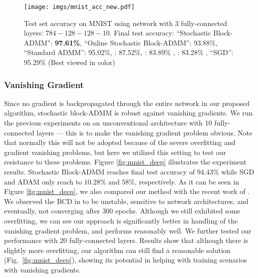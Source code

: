 \begin{figure}[ht]
\begin{center}
\centerline{
\texttt{[image: imgs/mnist\_acc\_new.pdf]}
}
\caption{Test set accuracy on MNIST using network with 3 fully-connected layers: $784-128-128-10$. 
Final test accuracy: ``Stochastic Block-ADMM'': {\bf 97.61\%}, 
``Online Stochastic Block-ADMM'': 93.88\%, 
``Standard ADMM'': 95.02\%, 
\protect \cite{taylor2016training}
: 87.52\%, 
\protect \cite{wang2019admm}: 83.89\% ,
\protect \cite{zeng2018global}: 83.28\% , 
``SGD'': 95.29\% 
(Best viewed in color)}
\label{fig:mnist_acc}
\end{center}
\end{figure}


\subsubsection{Vanishing Gradient}\label{exp:vanish}

Since no gradient is backpropagated through the entire network in our proposed algorithm, stochastic block-ADMM is robust against vanishing gradients. We run the previous experiments on an unconventional architecture with 10 fully-connected layers --- this is to make the vanishing gradient problem obvious. Note that normally this will not be adopted because of the severe overfitting and gradient vanishing problems, but here we utilized this setting to test our resistance to these problems. Figure \ref{fig:mnist_deep} illustrates the experiment results. Stochastic Block-ADMM reaches final test accuracy of $94.43\%$ while SGD and ADAM only reach to $10.28\%$ and $58\%$, respectively. As it can be seen in Figure \ref{fig:mnist_deep}, we also compared our method with the recent work of \cite{zeng2018global}. We observed the BCD in \cite{zeng2018global} %
to be unstable, sensitive to network architectures, and eventually, not converging after 300 epochs. Although we still exhibited some overfitting, we can see our approach is significantly better in handling of the vanishing gradient problem, and performs reasonably well. We further tested our performance with 20 fully-connected layers. Results show that although there is slightly more overfitting, our algorithm can still find a reasonable solution (Fig.~\ref{fig:mnist_deep}), showing its potential in helping with training scenarios with vanishing gradients.



